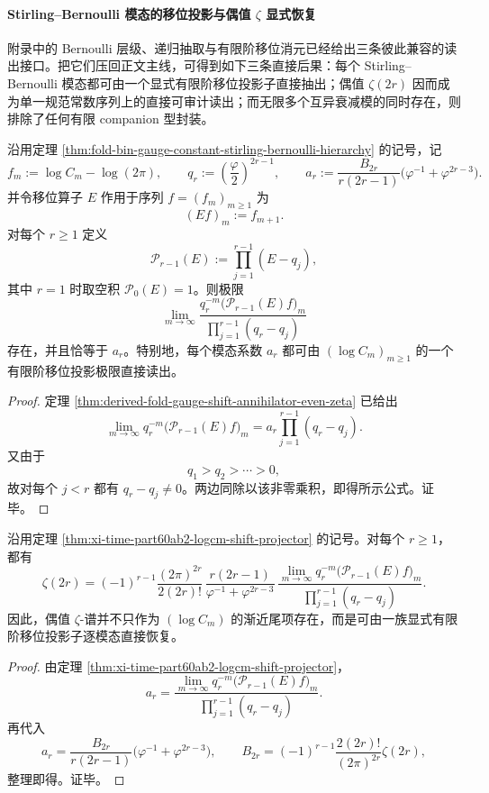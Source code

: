 \paragraph{Stirling--Bernoulli 模态的移位投影与偶值 \texorpdfstring{$\zeta$}{zeta} 显式恢复}
附录中的 Bernoulli 层级、递归抽取与有限阶移位消元已经给出三条彼此兼容的读出接口。把它们压回正文主线，可得到如下三条直接后果：每个 Stirling--Bernoulli 模态都可由一个显式有限阶移位投影子直接抽出；偶值 \(\zeta(2r)\) 因而成为单一规范常数序列上的直接可审计读出；而无限多个互异衰减模的同时存在，则排除了任何有限 companion 型封装。

\begin{theorem}\label{thm:xi-time-part60ab2-logcm-shift-projector}
沿用定理 \ref{thm:fold-bin-gauge-constant-stirling-bernoulli-hierarchy} 的记号，记
\[
f_m:=\log C_m-\log(2\pi),
\qquad
q_r:=\left(\frac{\varphi}{2}\right)^{2r-1},
\qquad
a_r:=\frac{B_{2r}}{r(2r-1)}\bigl(\varphi^{-1}+\varphi^{2r-3}\bigr).
\]
并令移位算子 \(E\) 作用于序列 \(f=(f_m)_{m\ge 1}\) 为
\[
(Ef)_m:=f_{m+1}.
\]
对每个 \(r\ge 1\) 定义
\[
\mathcal P_{r-1}(E):=\prod_{j=1}^{r-1}(E-q_j),
\]
其中 \(r=1\) 时取空积 \(\mathcal P_0(E)=1\)。则极限
\[
\lim_{m\to\infty}
\frac{q_r^{-m}\bigl(\mathcal P_{r-1}(E)f\bigr)_m}
{\prod_{j=1}^{r-1}(q_r-q_j)}
\]
存在，并且恰等于 \(a_r\)。特别地，每个模态系数 \(a_r\) 都可由 \((\log C_m)_{m\ge 1}\) 的一个有限阶移位投影极限直接读出。
\end{theorem}
\begin{proof}
定理 \ref{thm:derived-fold-gauge-shift-annihilator-even-zeta} 已给出
\[
\lim_{m\to\infty}q_r^{-m}\bigl(\mathcal P_{r-1}(E)f\bigr)_m
=
a_r\prod_{j=1}^{r-1}(q_r-q_j).
\]
又由于
\[
q_1>q_2>\cdots>0,
\]
故对每个 \(j<r\) 都有 \(q_r-q_j\neq 0\)。两边同除以该非零乘积，即得所示公式。证毕。
\end{proof}

\begin{corollary}\label{cor:xi-time-part60ab2-logcm-shift-even-zeta}
沿用定理 \ref{thm:xi-time-part60ab2-logcm-shift-projector} 的记号。对每个 \(r\ge 1\)，都有
\[
\zeta(2r)
=
(-1)^{r-1}\frac{(2\pi)^{2r}}{2(2r)!}\,
\frac{r(2r-1)}{\varphi^{-1}+\varphi^{2r-3}}\,
\frac{
\lim\limits_{m\to\infty}
q_r^{-m}\bigl(\mathcal P_{r-1}(E)f\bigr)_m
}
{\prod_{j=1}^{r-1}(q_r-q_j)}.
\]
因此，偶值 \(\zeta\)-谱并不只作为 \((\log C_m)\) 的渐近尾项存在，而是可由一族显式有限阶移位投影子逐模态直接恢复。
\end{corollary}
\begin{proof}
由定理 \ref{thm:xi-time-part60ab2-logcm-shift-projector}，
\[
a_r=
\frac{
\lim\limits_{m\to\infty}
q_r^{-m}\bigl(\mathcal P_{r-1}(E)f\bigr)_m
}
{\prod_{j=1}^{r-1}(q_r-q_j)}.
\]
再代入
\[
a_r=\frac{B_{2r}}{r(2r-1)}\bigl(\varphi^{-1}+\varphi^{2r-3}\bigr),
\qquad
B_{2r}=(-1)^{r-1}\frac{2(2r)!}{(2\pi)^{2r}}\zeta(2r),
\]
整理即得。证毕。
\end{proof}

